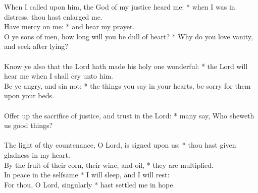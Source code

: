 \begin{Parallel}[v]{\colw}{\colx}
{}
{\vern
{\noindent
When I called upon him, the God of my justice heard me: * when I was in distress, thou hast enlarged me.\\
Have mercy on me: * and hear my prayer.\\
O ye sons of men, how long will you be dull of heart? * Why do you love vanity, and seek after lying?\\ \\
Know ye also that the Lord hath made his holy one wonderful: * the Lord will hear me when I shall cry unto him.\\
Be ye angry, and sin not: * the things you say in your hearts, be sorry for them upon your beds.\\ \\
Offer up the sacrifice of justice, and trust in the Lord: * many say, Who sheweth us good things?\\ \\
The light of thy countenance, O Lord, is signed upon us: * thou hast given gladness in my heart.\\
By the fruit of their corn, their wine, and oil, * they are multiplied.\\
In peace in the selfsame * I will sleep, and I will rest:\\
For thou, O Lord, singularly * hast settled me in hope.}}
\end{Parallel}


